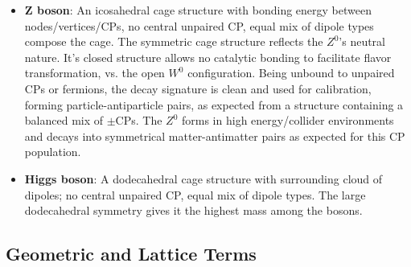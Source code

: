 \documentclass{article}
\begin{document}
\begin{itemize}
- All opposite-charge bonds spontaneously generate linear ZBW oscillation, contributing to the $W^0$ boson's mass. 

- The $W^0$ boson is a hypothetical neutral entity formed from Dipole Sea DPs that forms as a soliton in ambient conditions to catalyze neutron beta decay, and dissipate into the DP sea after performing its catalytic facilitation of down to up conversion with electron and antineutrino emission. 

- No central unpaired CP, but its open structure allows for vertex bonding. 

-Its hDP composition allows it to function as a catalytic agent for flavor transformation. In high energy/collider environments, the characteristic $\pm$W boson properties arise as sufficient ambient energy is available to give full real mass organizational energy to the $\pm$W as seen in its decay products. Thus, Capture of a fermion produces the familiar SM $\pm$W boson.  

\item \textbf{Z boson}: An icosahedral cage structure with bonding energy between nodes/vertices/CPs, no central unpaired CP, equal mix of dipole types compose the cage. The symmetric cage structure reflects the $Z^0$'s neutral nature. It's closed structure allows no catalytic bonding to facilitate flavor transformation, vs. the open $W^0$ configuration. Being unbound to unpaired CPs or fermions, the decay signature is clean and used for calibration, forming particle-antiparticle pairs, as expected from a structure containing a balanced mix of $\pm$CPs. The $Z^0$ forms in high energy/collider environments and decays into symmetrical matter-antimatter pairs as expected for this CP population.

\item \textbf{Higgs boson}: A dodecahedral cage structure with surrounding cloud of dipoles; no central unpaired CP, equal mix of dipole types. The large dodecahedral symmetry gives it the highest mass among the bosons.
\end{itemize}

\subsection{Geometric and Lattice Terms}
\end{document}
